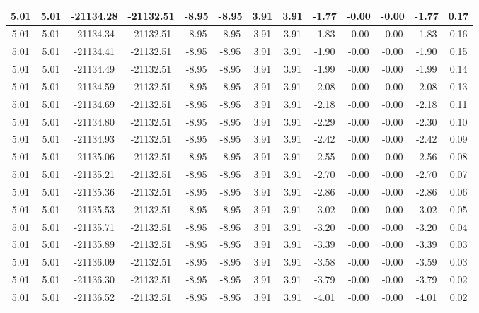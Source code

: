 \begin{table}[htbp]
\begin{adjustbox}{angle=90}
\begin{tabular}{|c|c|c|c|c|c|c|c|c|c|c|c|c|}
 5.01 & 5.01 & -21134.28 & -21132.51 & -8.95 & -8.95 & 3.91 & 3.91 & -1.77 & -0.00 & -0.00 & -1.77 & 0.17\\ \hline
 5.01 & 5.01 & -21134.34 & -21132.51 & -8.95 & -8.95 & 3.91 & 3.91 & -1.83 & -0.00 & -0.00 & -1.83 & 0.16\\ \hline
 5.01 & 5.01 & -21134.41 & -21132.51 & -8.95 & -8.95 & 3.91 & 3.91 & -1.90 & -0.00 & -0.00 & -1.90 & 0.15\\ \hline
 5.01 & 5.01 & -21134.49 & -21132.51 & -8.95 & -8.95 & 3.91 & 3.91 & -1.99 & -0.00 & -0.00 & -1.99 & 0.14\\ \hline
 5.01 & 5.01 & -21134.59 & -21132.51 & -8.95 & -8.95 & 3.91 & 3.91 & -2.08 & -0.00 & -0.00 & -2.08 & 0.13\\ \hline
 5.01 & 5.01 & -21134.69 & -21132.51 & -8.95 & -8.95 & 3.91 & 3.91 & -2.18 & -0.00 & -0.00 & -2.18 & 0.11\\ \hline
 5.01 & 5.01 & -21134.80 & -21132.51 & -8.95 & -8.95 & 3.91 & 3.91 & -2.29 & -0.00 & -0.00 & -2.30 & 0.10\\ \hline
 5.01 & 5.01 & -21134.93 & -21132.51 & -8.95 & -8.95 & 3.91 & 3.91 & -2.42 & -0.00 & -0.00 & -2.42 & 0.09\\ \hline
 5.01 & 5.01 & -21135.06 & -21132.51 & -8.95 & -8.95 & 3.91 & 3.91 & -2.55 & -0.00 & -0.00 & -2.56 & 0.08\\ \hline
 5.01 & 5.01 & -21135.21 & -21132.51 & -8.95 & -8.95 & 3.91 & 3.91 & -2.70 & -0.00 & -0.00 & -2.70 & 0.07\\ \hline
 5.01 & 5.01 & -21135.36 & -21132.51 & -8.95 & -8.95 & 3.91 & 3.91 & -2.86 & -0.00 & -0.00 & -2.86 & 0.06\\ \hline
 5.01 & 5.01 & -21135.53 & -21132.51 & -8.95 & -8.95 & 3.91 & 3.91 & -3.02 & -0.00 & -0.00 & -3.02 & 0.05\\ \hline
 5.01 & 5.01 & -21135.71 & -21132.51 & -8.95 & -8.95 & 3.91 & 3.91 & -3.20 & -0.00 & -0.00 & -3.20 & 0.04\\ \hline
 5.01 & 5.01 & -21135.89 & -21132.51 & -8.95 & -8.95 & 3.91 & 3.91 & -3.39 & -0.00 & -0.00 & -3.39 & 0.03\\ \hline
 5.01 & 5.01 & -21136.09 & -21132.51 & -8.95 & -8.95 & 3.91 & 3.91 & -3.58 & -0.00 & -0.00 & -3.59 & 0.03\\ \hline
 5.01 & 5.01 & -21136.30 & -21132.51 & -8.95 & -8.95 & 3.91 & 3.91 & -3.79 & -0.00 & -0.00 & -3.79 & 0.02\\ \hline
 5.01 & 5.01 & -21136.52 & -21132.51 & -8.95 & -8.95 & 3.91 & 3.91 & -4.01 & -0.00 & -0.00 & -4.01 & 0.02\\ \hline

\end{tabular}
\end{adjustbox}
\end{table}
